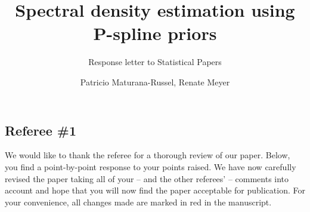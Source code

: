 \documentclass{scrartcl}
\title{Spectral density estimation using P-spline priors}
\subtitle{Response letter to Statistical Papers}
\author{Patricio Maturana-Russel, Renate Meyer}
\newcommand{\response}{}
\begin{document}
\maketitle\thispagestyle{empty}




\subsection*{Referee \#1}

\response{We would like to thank the referee for a thorough review of our paper. Below, you find a point-by-point response to your points raised. We have now carefully revised the paper taking all of your -- and the other referees' -- comments into account and hope that you will now find the paper acceptable for publication. For your convenience, all changes made are marked in red in the manuscript.} 
\end{document}
